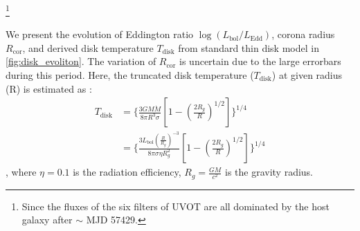









\footnote{Since the fluxes of the six filters of UVOT are all dominated by the host galaxy after $\sim$ MJD 57429.}



We present the evolution of Eddington ratio $\log(L_\mathrm{bol}/L_\mathrm{Edd})$, corona radius $R_\mathrm{cor}$, and derived disk temperature $T_\mathrm{disk}$ from standard thin disk model in \autoref{fig:disk_evoliton}. The variation of $R_\mathrm{cor}$ is uncertain due to the large errorbars during this period. Here, the truncated disk temperature ($T_\mathrm{disk}$) at given radius (R) is estimated as :
\begin{equation}
\begin{aligned}
    T_\mathrm{disk} & = \{\frac{3GM\dot{M}}{8\pi R^3 \sigma}[1-(\frac{2 R_g}{R})^{1/2}]\}^{1/4} \\ & = \{\frac{3 L_\mathrm{bol} (\frac{R}{R_g})^{-3}}{8\pi \sigma \eta R_g^2}[1-(\frac{2 R_g}{R})^{1/2}]\}^{1/4}
\end{aligned}
\end{equation}, where $\eta=0.1$ is the radiation efficiency, $R_g=\frac{GM}{c^2}$ is the gravity radius.


